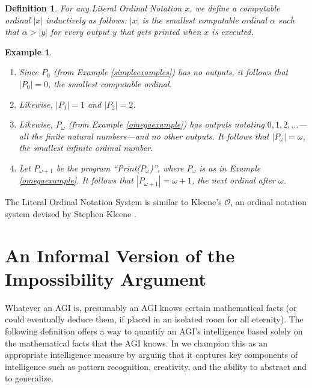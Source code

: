 \documentclass[runningheads]{llncs}
\newtheorem{myexample}[mytheorem]{Example}
\newtheorem{mydefinition}[mytheorem]{Definition}
\begin{document}
\begin{mydefinition}
    For any Literal Ordinal Notation $x$, we define a computable ordinal $|x|$
    inductively as follows: $|x|$ is the smallest computable ordinal $\alpha$
    such that $\alpha>|y|$ for every output $y$ that gets printed when $x$ is
    executed.
\end{mydefinition}

\begin{myexample}
    \begin{enumerate}
        \item
        Since $P_0$ (from Example \ref{simpleexamples}) has no outputs,
        it follows that $|P_0|=0$, the smallest computable ordinal.
        \item
        Likewise, $|P_1|=1$ and $|P_2|=2$.
        \item
        Likewise, $P_\omega$ (from Example \ref{omegaexample}) has outputs
        notating $0, 1, 2, \ldots$---all the finite natural numbers---and no
        other outputs. It follows that $|P_\omega|=\omega$, the smallest
        infinite ordinal number.
        \item
        Let $P_{\omega+1}$ be the program ``Print($P_\omega$)'',
        where $P_\omega$ is as in Example \ref{omegaexample}.
        It follows that $|P_{\omega+1}|=\omega+1$, the next ordinal after
        $\omega$.
    \end{enumerate}
\end{myexample}

The Literal Ordinal Notation System is similar to Kleene's $\mathcal O$,
an ordinal notation system devised by Stephen Kleene \cite{kleene1938notation}.

\section{An Informal Version of the Impossibility Argument}
\label{informalargumentsection}

Whatever an AGI is, presumably an AGI knows certain mathematical facts
(or could eventually deduce them, if placed in an isolated room for all eternity).
The following definition offers a way to quantify an AGI's intelligence based
solely on the mathematical facts that the AGI knows. In \cite{alexander2019measuring}
we champion this as an appropriate intelligence measure by arguing that it
captures key components of intelligence such as pattern recognition, creativity, and
the ability to abstract and to generalize.
\end{document}
